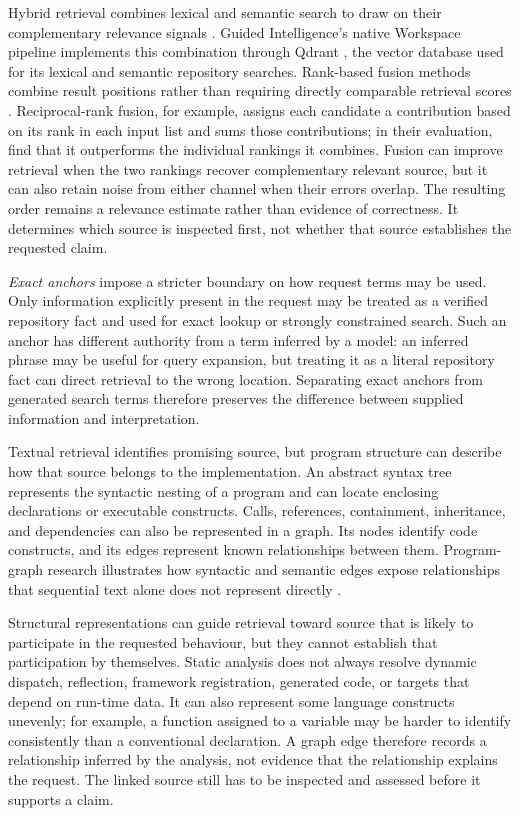 Hybrid retrieval combines lexical and semantic search to draw on their complementary relevance signals \textcite{Bruch2023HybridFusion}. Guided Intelligence's native Workspace pipeline implements this combination through Qdrant \textcite{QdrantDocumentation}, the vector database used for its lexical and semantic repository searches. Rank-based fusion methods combine result positions rather than requiring directly comparable retrieval scores \textcite{Cormack2009RRF}. Reciprocal-rank fusion, for example, assigns each candidate a contribution based on its rank in each input list and sums those contributions; in their evaluation, \textcite{Cormack2009RRF} find that it outperforms the individual rankings it combines. Fusion can improve retrieval when the two rankings recover complementary relevant source, but it can also retain noise from either channel when their errors overlap. The resulting order remains a relevance estimate rather than evidence of correctness. It determines which source is inspected first, not whether that source establishes the requested claim.

\emph{Exact anchors} impose a stricter boundary on how request terms may be used. Only information explicitly present in the request may be treated as a verified repository fact and used for exact lookup or strongly constrained search. Such an anchor has different authority from a term inferred by a model: an inferred phrase may be useful for query expansion, but treating it as a literal repository fact can direct retrieval to the wrong location. Separating exact anchors from generated search terms therefore preserves the difference between supplied information and interpretation.

Textual retrieval identifies promising source, but program structure can describe how that source belongs to the implementation. An abstract syntax tree represents the syntactic nesting of a program and can locate enclosing declarations or executable constructs. Calls, references, containment, inheritance, and dependencies can also be represented in a graph. Its nodes identify code constructs, and its edges represent known relationships between them. Program-graph research illustrates how syntactic and semantic edges expose relationships that sequential text alone does not represent directly \textcite{Allamanis2018ProgramGraphs}.

Structural representations can guide retrieval toward source that is likely to participate in the requested behaviour, but they cannot establish that participation by themselves. Static analysis does not always resolve dynamic dispatch, reflection, framework registration, generated code, or targets that depend on run-time data. It can also represent some language constructs unevenly; for example, a function assigned to a variable may be harder to identify consistently than a conventional declaration. A graph edge therefore records a relationship inferred by the analysis, not evidence that the relationship explains the request. The linked source still has to be inspected and assessed before it supports a claim.

